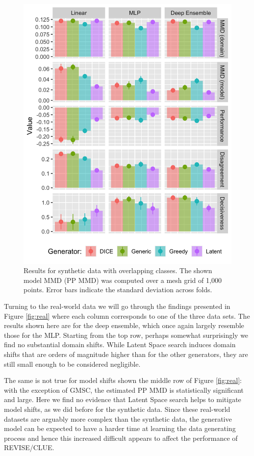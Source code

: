 \documentclass[conference,final,]{IEEEtran}
\theoremstyle{definition}
\theoremstyle{definition}
\theoremstyle{definition}
\theoremstyle{definition}
\theoremstyle{remark}
\begin{document}
\begin{figure}

{\centering \includegraphics[width=0.9\linewidth]{www/synthetic_results} 

}

\caption{Results for synthetic data with overlapping classes. The shown model MMD (PP MMD) was computed over a mesh grid of 1,000 points. Error bars indicate the standard deviation across folds.}\label{fig:syn}
\end{figure}

Turning to the real-world data we will go through the findings presented in Figure \ref{fig:real} where each column corresponds to one of the three data sets. The results shown here are for the deep ensemble, which once again largely resemble those for the MLP. Starting from the top row, perhaps somewhat surprisingly we find no substantial domain shifts. While Latent Space search induces domain shifts that are orders of magnitude higher than for the other generators, they are still small enough to be considered negligible.

The same is not true for model shifts shown the middle row of Figure \ref{fig:real}: with the exception of GMSC, the estimated PP MMD is statistically significant and large. Here we find no evidence that Latent Space search helps to mitigate model shifts, as we did before for the synthetic data. Since these real-world datasets are arguably more complex than the synthetic data, the generative model can be expected to have a harder time at learning the data generating process and hence this increased difficult appears to affect the performance of REVISE/CLUE.
\end{document}
